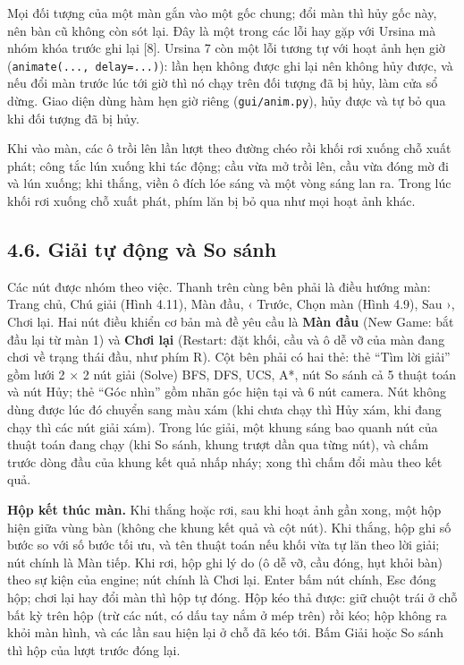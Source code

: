 Mọi đối tượng của một màn gắn vào một gốc chung; đổi màn thì hủy gốc này, nên bàn cũ không còn sót lại. Đây là một trong các lỗi hay gặp với Ursina mà nhóm khóa trước ghi lại {[}8{]}. Ursina 7 còn một lỗi tương tự với hoạt ảnh hẹn giờ (\texttt{animate(.\allowbreak{}.\allowbreak{}.\allowbreak{}, delay=.\allowbreak{}.\allowbreak{}.\allowbreak{})}): lần hẹn không được ghi lại nên không hủy được, và nếu đổi màn trước lúc tới giờ thì nó chạy trên đối tượng đã bị hủy, làm cửa sổ dừng. Giao diện dùng hàm hẹn giờ riêng (\texttt{gui/\allowbreak{}anim.\allowbreak{}py}), hủy được và tự bỏ qua khi đối tượng đã bị hủy.

Khi vào màn, các ô trồi lên lần lượt theo đường chéo rồi khối rơi xuống chỗ xuất phát; công tắc lún xuống khi tác động; cầu vừa mở trồi lên, cầu vừa đóng mờ đi và lún xuống; khi thắng, viền ô đích lóe sáng và một vòng sáng lan ra. Trong lúc khối rơi xuống chỗ xuất phát, phím lăn bị bỏ qua như mọi hoạt ảnh khác.

\subsection{4.6. Giải tự động và So sánh}

Các nút được nhóm theo việc. Thanh trên cùng bên phải là điều hướng màn: Trang chủ, Chú giải (Hình 4.11), Màn đầu, ‹ Trước, Chọn màn (Hình 4.9), Sau ›, Chơi lại. Hai nút điều khiển cơ bản mà đề yêu cầu là \textbf{Màn đầu} (New Game: bắt đầu lại từ màn 1) và \textbf{Chơi lại} (Restart: đặt khối, cầu và ô dễ vỡ của màn đang chơi về trạng thái đầu, như phím R). Cột bên phải có hai thẻ: thẻ ``Tìm lời giải'' gồm lưới 2 × 2 nút giải (Solve) BFS, DFS, UCS, A*, nút So sánh cả 5 thuật toán và nút Hủy; thẻ ``Góc nhìn'' gồm nhãn góc hiện tại và 6 nút camera. Nút không dùng được lúc đó chuyển sang màu xám (khi chưa chạy thì Hủy xám, khi đang chạy thì các nút giải xám). Trong lúc giải, một khung sáng bao quanh nút của thuật toán đang chạy (khi So sánh, khung trượt dần qua từng nút), và chấm trước dòng đầu của khung kết quả nhấp nháy; xong thì chấm đổi màu theo kết quả.

\textbf{Hộp kết thúc màn.} Khi thắng hoặc rơi, sau khi hoạt ảnh gần xong, một hộp hiện giữa vùng bàn (không che khung kết quả và cột nút). Khi thắng, hộp ghi số bước so với số bước tối ưu, và tên thuật toán nếu khối vừa tự lăn theo lời giải; nút chính là Màn tiếp. Khi rơi, hộp ghi lý do (ô dễ vỡ, cầu đóng, hụt khỏi bàn) theo sự kiện của engine; nút chính là Chơi lại. Enter bấm nút chính, Esc đóng hộp; chơi lại hay đổi màn thì hộp tự đóng. Hộp kéo thả được: giữ chuột trái ở chỗ bất kỳ trên hộp (trừ các nút, có dấu tay nắm ở mép trên) rồi kéo; hộp không ra khỏi màn hình, và các lần sau hiện lại ở chỗ đã kéo tới. Bấm Giải hoặc So sánh thì hộp của lượt trước đóng lại.

